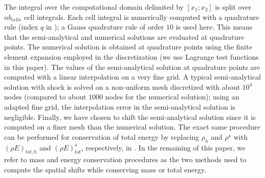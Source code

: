 \documentclass[times,doublespace]{fldauth}%
\begin{document}
The integral over the computational domain delimited by $[x_1; x_2]$ is split over $nb_{cells}$ cell integrals. Each cell integral is numerically computed with a quadrature rule (index $q$ in ); a Gauss quadrature rule of order $10$ is used here. This means that the semi-analytical and numerical solutions are evaluated at quadrature points. The numerical solution is obtained at quadrature points using the finite element expansion employed in the discretization (we use Lagrange test functions in this paper). The values of the semi-analytical solution at quadrature points are computed with a linear interpolation on a very fine grid.
A typical semi-analytical solution with shock is solved on a non-uniform mesh discretized with about $10^4$ nodes (compared to about $1000$ nodes for the numerical solution); using an adapted fine grid,  the interpolation error in the semi-analytical solution is negligible. Finally, we have chosen to shift the semi-analytical solution since it is computed on a finer mesh than the numerical solution. The exact same procedure can be performed for conservation of total energy by replacing $\rho_h$ and $\rho^\star$ with $(\rho E)_{tot,h}$ and $(\rho E)^\star_{tot}$, respectively, in . In the remaining of this paper, we refer to mass and energy conservation procedures as the two methods used to compute the spatial shifts while conserving mass or total energy.
\end{document}
